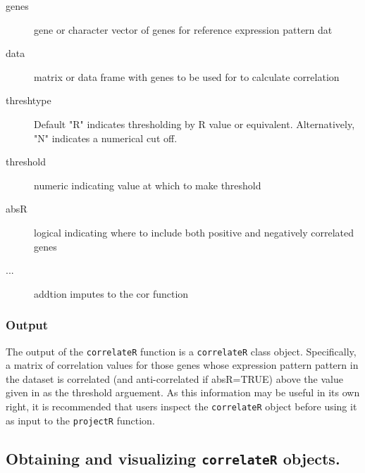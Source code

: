 \documentclass[]{article}
\begin{document}
\begin{description}
\item[genes]{gene or character vector of genes for reference expression pattern dat}
\item[data]{matrix or data frame with genes to be used for to calculate correlation}
\item[threshtype]{Default "R" indicates thresholding by R value or equivalent. Alternatively, "N" indicates a numerical cut off.}
\item[threshold]{numeric indicating value at which to make threshold}
\item[absR]{logical indicating where to include both positive and negatively correlated genes}
\item[...]{addtion imputes to the cor function}
\end{description}

\hypertarget{output-4}{%
\subsubsection{Output}\label{output-4}}

The output of the \texttt{correlateR} function is a \texttt{correlateR} class object. Specifically, a matrix of correlation values for those genes whose expression pattern pattern in the dataset is correlated (and anti-correlated if absR=TRUE) above the value given in as the threshold arguement. As this information may be useful in its own right, it is recommended that users inspect the \texttt{correlateR} object before using it as input to the \texttt{projectR} function.

\hypertarget{obtaining-and-visualizing-objects.}{%
\subsection{\texorpdfstring{Obtaining and visualizing \texttt{correlateR} objects.}{Obtaining and visualizing  objects.}}\label{obtaining-and-visualizing-objects.}}
\end{document}
